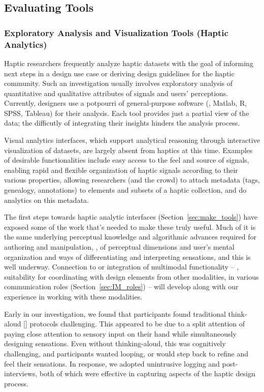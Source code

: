 %
%
\subsection{Evaluating \haxd Tools}


\subsubsection{Exploratory Analysis and Visualization Tools (Haptic Analytics)} 
Haptic researchers frequently analyze haptic datasets with the goal of informing next steps in a design use case or deriving design guidelines for the haptic community. 
Such an  investigation usually involves exploratory analysis of quantitative and qualitative attributes of signals and users' perceptions. 
Currently, designers use a potpourri of general-purpose software (\eg, Matlab, R, SPSS, Tableau) for their analysis. Each tool provides just a partial view of the data; the difficutly of integrating their insights hinders the analysis process. 

Visual analytics interfaces, which support analytical reasoning through interactive visualization of datasets, are largely absent from haptics at this time. 
Examples of desirable functionalities  include easy access to the feel and source of signals, enabling rapid and flexible organization of haptic signals according to their various properties, allowing researchers (and the crowd) to attach metadata (tags, genealogy, annotations) to elements and subsets of a haptic collection, and do analytics on this metadata.


The first steps towards haptic analytic interfaces (Section~\ref{sec:make_tools}) have exposed some of the work that's needed to make these truly useful. Much of it is the same underlying perceptual knowledge and  algorithmic advances required for authoring and manipulation, \eg, of perceptual dimensions and user's mental organization and ways of differentiating and interpreting sensations, and this is well underway. 
%
Connection to or integration of multimodal functionality -- \eg, suitability for coordinating with design elements from other modalities, in various communication roles (Section~\ref{sec:IM_roles}) -- will develop along with our experience in working with these modalities. 



Early in our investigation, we found that participants found traditional think-aloud [] protocols challenging.
This appeared to be due to a split attention of paying close attention to sensory input on their hand while simultaneously designing sensations.
Even without thinking-aloud, this was cognitively challenging, and participants wanted looping, or would step back to refine and feel their sensations.
In response, we adopted unintrusive logging and post-interviews, both of which were effective in capturing aspects of the haptic design process. 

